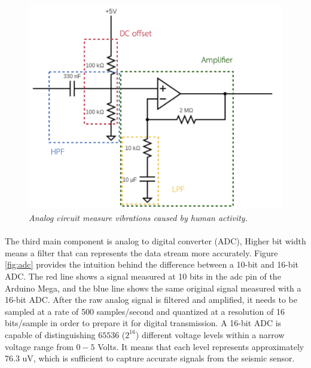 \begin{figure}[H]
  \centering
  \caption[Analog circuit measure vibrations caused by human activity.]{\emph{Analog circuit measure vibrations caused by human activity.}}\label{fig:analog_circuit}
  \includegraphics[scale = 0.2]{figures/analogcircuit.jpg}  
\end{figure}

\paragraph{}
The third main component is analog to digital converter (ADC), Higher bit width means a filter that can represents the data stream more accurately. Figure \ref{fig:adc} provides the intuition behind the difference between a 10-bit and 16-bit ADC.  The red line shows a signal measured at 10 bits in the adc pin of the Arduino Mega, and the blue line shows the same original signal measured with a 16-bit ADC. After the raw analog signal is filtered and amplified, it needs to be sampled at a rate of 500 samples/second and quantized at a resolution of 16 bits/sample in order to prepare it for digital transmission. A 16-bit ADC is capable of distinguishing $65536$ ($2^{16}$) different voltage levels within a narrow voltage range from $0 - 5$ Volts. It means that each level represents approximately 76.3 uV, which is sufficient to capture accurate signals from the seismic sensor.

